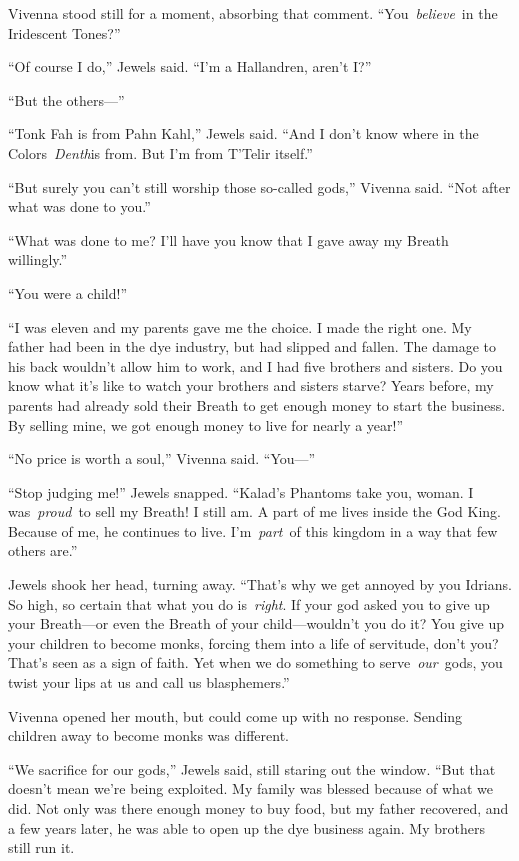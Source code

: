 Vivenna stood still for a moment, absorbing that comment. “You~\textit{believe}~in the Iridescent Tones?”

“Of course I do,” Jewels said. “I’m a Hallandren, aren’t I?”

“But the others—”

“Tonk Fah is from Pahn Kahl,” Jewels said. “And I don’t know where in the Colors~\textit{Denth}is from. But I’m from T’Telir itself.”

“But surely you can’t still worship those so-called gods,” Vivenna said. “Not after what was done to you.”

“What was done to me? I’ll have you know that I gave away my Breath willingly.”

“You were a child!”

“I was eleven and my parents gave me the choice. I made the right one. My father had been in the dye industry, but had slipped and fallen. The damage to his back wouldn’t allow him to work, and I had five brothers and sisters. Do you know what it’s like to watch your brothers and sisters starve? Years before, my parents had already sold their Breath to get enough money to start the business. By selling mine, we got enough money to live for nearly a year!”

“No price is worth a soul,” Vivenna said. “You—”

“Stop judging me!” Jewels snapped. “Kalad’s Phantoms take you, woman. I was~\textit{proud}~to sell my Breath! I still am. A part of me lives inside the God King. Because of me, he continues to live. I’m~\textit{part}~of this kingdom in a way that few others are.”

Jewels shook her head, turning away. “That’s why we get annoyed by you Idrians. So high, so certain that what you do is~\textit{right}. If your god asked you to give up your Breath—or even the Breath of your child—wouldn’t you do it? You give up your children to become monks, forcing them into a life of servitude, don’t you? That’s seen as a sign of faith. Yet when we do something to serve~\textit{our}~gods, you twist your lips at us and call us blasphemers.”

Vivenna opened her mouth, but could come up with no response. Sending children away to become monks was different.

“We sacrifice for our gods,” Jewels said, still staring out the window. “But that doesn’t mean we’re being exploited. My family was blessed because of what we did. Not only was there enough money to buy food, but my father recovered, and a few years later, he was able to open up the dye business again. My brothers still run it.

